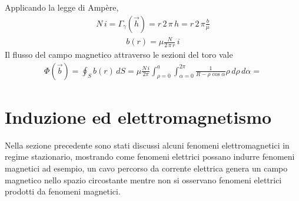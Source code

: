 \documentclass[letterpaper,10pt,italian]{jupyterBook}
\begin{document}
\sphinxAtStartPar
Applicando la legge di Ampère,
\begin{equation*}
\begin{split}N \, i = \Gamma_{\gamma}(\vec{h}) = r \, 2 \, \pi \, h = r \, 2 \, \pi \frac{b}{\mu}\end{split}
\end{equation*}\begin{equation*}
\begin{split}b(r) = \mu \frac{N}{2 \, \pi \, r } \, i\end{split}
\end{equation*}
\sphinxAtStartPar
Il flusso del campo magnetico attraverso le sezioni del toro vale
\begin{equation*}
\begin{split}\Phi(\vec{b}) = \oint_{S} b(r) \, dS =  \mu \frac{N \, i}{2 \pi}\int_{\rho=0}^{a} \int_{\alpha=0}^{2\pi} \frac{1}{R - \rho \cos \alpha} \rho \, d \rho \, d \alpha  = \end{split}
\end{equation*}
\sphinxAtStartPar
{}

\sphinxstepscope


\section{Induzione ed elettromagnetismo}
\label{\detokenize{ch/electromagnetism/electromagnetism-general:induzione-ed-elettromagnetismo}}\label{\detokenize{ch/electromagnetism/electromagnetism-general:physics-hs-electromagnetism-electromagnetism-general}}\label{\detokenize{ch/electromagnetism/electromagnetism-general::doc}}
\sphinxAtStartPar
Nella sezione precedente sono stati discussi alcuni fenomeni elettromagnetici in regime stazionario, mostrando come fenomeni elettrici possano indurre fenomeni magnetici \sphinxhyphen{} ad esempio, un cavo percorso da corrente elettrica genera un campo magnetico nello spazio circostante \sphinxhyphen{} mentre non si osservano fenomeni elettrici prodotti da fenomeni magnetici.
\end{document}
